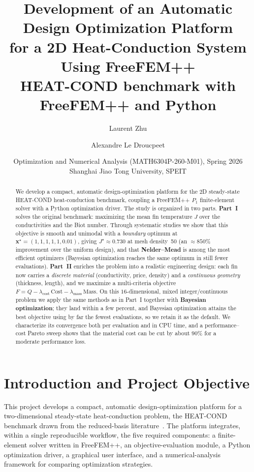\documentclass[11pt,a4paper]{article}
\title{%
\textbf{Development of an Automatic Design Optimization Platform\\
for a 2D Heat-Conduction System Using FreeFEM++}\\[4pt]
\large HEAT-COND benchmark with FreeFEM++ and Python}
\author{Laurent Zhu \and Alexandre Le Droucpeet}
\date{Optimization and Numerical Analysis (MATH6304P-260-M01), Spring 2026\\
Shanghai Jiao Tong University, SPEIT}
\begin{document}
\maketitle

\begin{abstract}
\noindent We develop a compact, automatic design-optimization platform for the 2D
steady-state HEAT-COND heat-conduction benchmark, coupling a FreeFEM++ $P_1$ finite-element
solver with a Python optimization driver. The study is organized in two parts.
\textbf{Part~I} solves the original benchmark: maximizing the mean fin temperature
$J$ over the conductivities and the Biot number. Through systematic studies we show that
this objective is smooth and unimodal with a \emph{boundary} optimum at
$\mathbf{x}^\star=(1,1,1,1,1,0.01)$, giving $J^\star\approx0.730$ at mesh density~50 (an
$\approx850\%$ improvement over the uniform design), and that \textbf{Nelder--Mead} is among the
most efficient optimizers (Bayesian optimization reaches the same optimum in still fewer evaluations). \textbf{Part~II} enriches the problem into
a realistic engineering design: each fin now carries a \emph{discrete material} (conductivity,
price, density) and a \emph{continuous geometry} (thickness, length), and we maximize a
multi-criteria objective $F = Q - \lambda_{\text{cost}}\,\text{Cost} - \lambda_{\text{mass}}\,\text{Mass}$.
On this $16$-dimensional, mixed integer/continuous problem we apply the same methods as in Part~I
together with \textbf{Bayesian optimization}; they land within a few percent, and Bayesian optimization
attains the best objective using by far the fewest evaluations, so we retain it as the default.
We characterize its convergence both per evaluation and in CPU time, and a
performance--cost Pareto sweep shows that the material cost can be cut by about $90\%$ for a
moderate performance loss.
\end{abstract}

\section{Introduction and Project Objective}
This project develops a compact, automatic design-optimization platform for a two-dimensional
steady-state heat-conduction problem, the HEAT-COND benchmark drawn from the reduced-basis
literature~\cite{ballout2024}. The platform integrates, within a single reproducible workflow,
the five required components: a finite-element solver written in FreeFEM++, an objective-evaluation
module, a Python optimization driver, a graphical user interface, and a numerical-analysis
framework for comparing optimization strategies.
\end{document}
